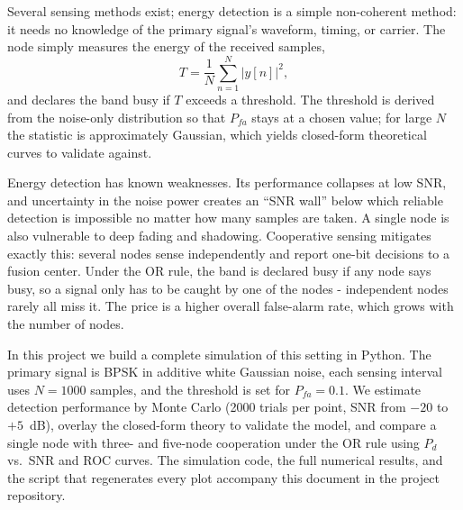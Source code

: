 \documentclass[11pt,a4paper]{article}
\begin{document}
Several sensing methods exist; energy detection is a simple non-coherent
method: it needs no knowledge of the primary signal's
waveform, timing, or carrier. The node simply measures the energy of the received
samples,
\[
T = \frac{1}{N}\sum_{n=1}^{N} |y[n]|^2,
\]
and declares the band busy if $T$ exceeds a threshold. The threshold is derived from
the noise-only distribution so that $P_{fa}$ stays at a chosen value; for large $N$
the statistic is approximately Gaussian, which yields closed-form theoretical curves
to validate against.

Energy detection has known weaknesses. Its performance collapses at low SNR, and
uncertainty in the noise power creates an ``SNR wall'' below which reliable
detection is impossible no matter how many samples are taken. A single node is also
vulnerable to deep fading and shadowing. Cooperative sensing mitigates exactly this:
several nodes sense independently and report one-bit decisions to a fusion center.
Under the OR rule, the band is declared busy if any node says busy, so a signal only
has to be caught by one of the nodes - independent nodes rarely all miss it. The
price is a higher overall false-alarm rate, which grows with the number of nodes.

In this project we build a complete simulation of this setting in Python. The
primary signal is BPSK in additive white Gaussian noise, each sensing interval uses
$N = 1000$ samples, and the threshold is set for $P_{fa} = 0.1$. We estimate
detection performance by Monte Carlo (2000 trials per point, SNR from $-20$ to
$+5$~dB), overlay the closed-form theory to validate the model, and compare a single
node with three- and five-node cooperation under the OR rule using $P_d$ vs.\ SNR
and ROC curves. The simulation code, the full numerical results, and the script
that regenerates every plot accompany this document in the project repository.
\end{document}
